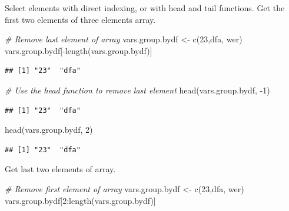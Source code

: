 \documentclass[
]{book}
\newenvironment{Shaded}{\begin{snugshade}}{\end{snugshade}}
\newcommand{\CommentTok}[1]{\textcolor[rgb]{0.56,0.35,0.01}{\textit{#1}}}
\newcommand{\DecValTok}[1]{\textcolor[rgb]{0.00,0.00,0.81}{#1}}
\newcommand{\FunctionTok}[1]{\textcolor[rgb]{0.00,0.00,0.00}{#1}}
\newcommand{\NormalTok}[1]{#1}
\newcommand{\OtherTok}[1]{\textcolor[rgb]{0.56,0.35,0.01}{#1}}
\newcommand{\SpecialCharTok}[1]{\textcolor[rgb]{0.00,0.00,0.00}{#1}}
\newcommand{\StringTok}[1]{\textcolor[rgb]{0.31,0.60,0.02}{#1}}
\begin{document}
Select elements with direct indexing, or with head and tail functions. Get the first two elements of three elements array.

\begin{Shaded}
\begin{Highlighting}[]
\CommentTok{\# Remove last element of array}
\NormalTok{vars.group.bydf }\OtherTok{\textless{}{-}} \FunctionTok{c}\NormalTok{(}\StringTok{\textquotesingle{}23\textquotesingle{}}\NormalTok{,}\StringTok{\textquotesingle{}dfa\textquotesingle{}}\NormalTok{, }\StringTok{\textquotesingle{}wer\textquotesingle{}}\NormalTok{)}
\NormalTok{vars.group.bydf[}\SpecialCharTok{{-}}\FunctionTok{length}\NormalTok{(vars.group.bydf)]}
\end{Highlighting}
\end{Shaded}

\begin{verbatim}
## [1] "23"  "dfa"
\end{verbatim}

\begin{Shaded}
\begin{Highlighting}[]
\CommentTok{\# Use the head function to remove last element}
\FunctionTok{head}\NormalTok{(vars.group.bydf, }\SpecialCharTok{{-}}\DecValTok{1}\NormalTok{)}
\end{Highlighting}
\end{Shaded}

\begin{verbatim}
## [1] "23"  "dfa"
\end{verbatim}

\begin{Shaded}
\begin{Highlighting}[]
\FunctionTok{head}\NormalTok{(vars.group.bydf, }\DecValTok{2}\NormalTok{)}
\end{Highlighting}
\end{Shaded}

\begin{verbatim}
## [1] "23"  "dfa"
\end{verbatim}

Get last two elements of array.

\begin{Shaded}
\begin{Highlighting}[]
\CommentTok{\# Remove first element of array}
\NormalTok{vars.group.bydf }\OtherTok{\textless{}{-}} \FunctionTok{c}\NormalTok{(}\StringTok{\textquotesingle{}23\textquotesingle{}}\NormalTok{,}\StringTok{\textquotesingle{}dfa\textquotesingle{}}\NormalTok{, }\StringTok{\textquotesingle{}wer\textquotesingle{}}\NormalTok{)}
\NormalTok{vars.group.bydf[}\DecValTok{2}\SpecialCharTok{:}\FunctionTok{length}\NormalTok{(vars.group.bydf)]}
\end{Highlighting}
\end{Shaded}
\end{document}
